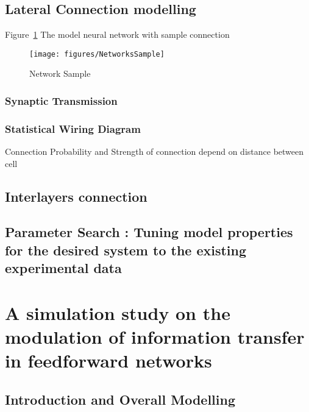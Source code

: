 \subsection{Lateral Connection modelling}

Figure~\ref{fig:NetSample} The model neural network with sample connection
\begin{figure}
	\centering
	\texttt{[image: figures/NetworksSample]}
	\label{fig:NetSample}
	\caption{Network Sample}
\end{figure}

\subsubsection{Synaptic Transmission}
\subsubsection{Statistical Wiring Diagram}
Connection Probability and  Strength of connection depend on distance between cell~\cite{ringach2004haphazard,mclaughlin2000neuronal}


\subsection{Interlayers connection}


\subsection{Parameter Search : Tuning model properties for the desired system to the existing experimental data}


\section{A simulation study on the modulation of information transfer in feedforward networks}

\subsection{Introduction and Overall Modelling}

